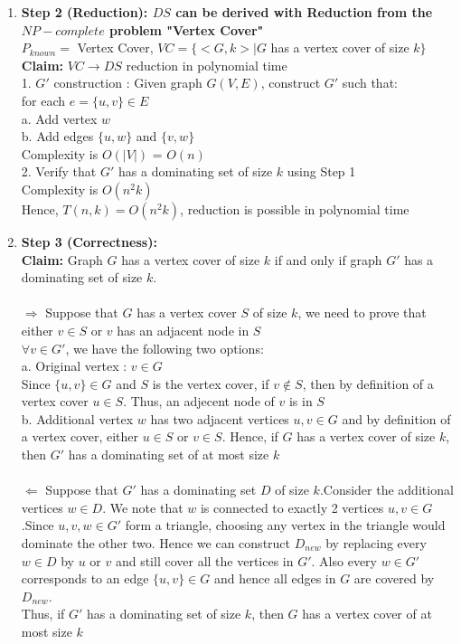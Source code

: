 \documentclass{article}
\begin{document}
\begin{enumerate}
\begin{enumerate}
   \item\textbf{Step 2 (Reduction): $DS$ can be derived with Reduction from the $NP-complete$ problem "Vertex Cover" } \\
   $P_{known} =$ Vertex Cover, $VC =\{<G,k>| G$ has a vertex cover of size $k\}$\\
   \textbf{Claim:} $VC \rightarrow DS$ reduction in polynomial time \\
   1. $G'$ construction :  Given graph $G(V,E)$, construct $G'$ such that:\\
   for each $ e=\{u,v\} \in E$\\
   a. Add vertex $w$\\
   b. Add edges $\{u,w\}$ and $\{v,w\}$\\
   Complexity is $O(\left|V\right|)$ = $O(n)$\\
   2. Verify that $G'$ has a dominating set of size $k$ using Step 1\\
   Complexity is $O(n^2k)$\\
   Hence, $T(n,k) = O(n^2k)$, reduction is possible in polynomial time\\
   \item\textbf{Step 3 (Correctness): } \\
   \textbf{Claim:} Graph $G$ has a vertex cover of size $k$ if and only if graph $G'$ has a dominating set of size $k$.\\ \\
   $\Rightarrow$ Suppose that $G$ has a vertex cover $S$ of size $k$, we need to prove that either $v \in S$ or $v$ has an adjacent node in $S$ \\
   $\forall v \in G'$, we have the following two options:\\
   a. Original vertex : $v \in G$ \\
   Since $\{u,v\} \in G$ and $S$ is the vertex cover, if $v \notin S$, then by definition of a vertex cover $u \in S$. Thus, an adjecent node of $v$ is in $S$\\
   b. Additional vertex $w$ has two adjacent vertices $u, v \in G$ and by definition of a vertex cover, either $u \in S$ or $v \in S$.
   Hence, if $G$ has a vertex cover of size $k$, then $G'$ has a dominating set of at most size $k$\\ \\
   $\Leftarrow$ Suppose that $G'$ has a dominating set $D$ of size $k$.Consider the additional vertices $w \in D$. We note that $w$ is connected to exactly 2 vertices $u,v \in G$.Since $u,v,w \in G'$ form a triangle, choosing any vertex in the triangle would dominate the other two. Hence we can construct $D_{new}$ by replacing every $w \in D$ by $u$ or $v$ and still cover all the vertices in $G'$. Also every $w \in G'$ corresponds to an edge $\{u,v\} \in G$ and hence all edges in $G$ are covered by $D_{new}$.\\
   Thus, if $G'$ has a dominating set of size $k$, then $G$ has a vertex cover of at most size $k$\\
  \end{enumerate}
\end{enumerate}
\end{document}
